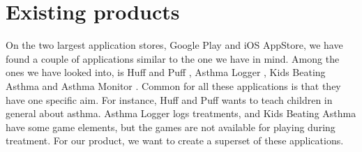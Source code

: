 \section{Existing products}
\label{sec:exisiting-products}

On the two largest application stores, Google Play and iOS AppStore, we have found a couple of applications similar to the one we have in mind. Among the ones we have looked into, is Huff and Puff , Asthma Logger
, Kids Beating Asthma  and Asthma Monitor . Common for all these applications is that they have one specific aim. For instance, Huff and Puff wants to teach children in general about asthma. Asthma Logger logs treatments, and Kids Beating Asthma have some game elements, but the games are not available for playing during treatment. For our product, we want to create a superset of these applications. 

